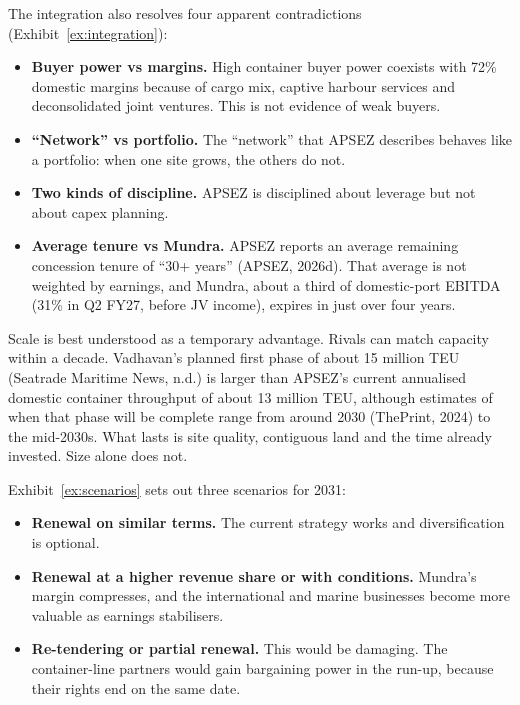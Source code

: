 \documentclass[12pt, a4paper]{article}
\begin{document}
The integration also resolves four apparent contradictions
(Exhibit~\ref{ex:integration}):
\begin{itemize}
  \item \textbf{Buyer power vs margins.} High container buyer power coexists
        with 72\% domestic margins because of cargo mix, captive harbour
        services and deconsolidated joint ventures. This is not evidence of weak
        buyers.
  \item \textbf{``Network'' vs portfolio.} The ``network'' that APSEZ describes
        behaves like a portfolio: when one site grows, the others do not.
  \item \textbf{Two kinds of discipline.} APSEZ is disciplined about leverage
        but not about capex planning.
  \item \textbf{Average tenure vs Mundra.} APSEZ reports an average remaining
        concession tenure of ``30+ years'' (APSEZ, 2026d). That average is not
        weighted by earnings, and Mundra, about a third of domestic-port EBITDA
        (31\% in Q2 FY27, before JV income), expires in just over four years.
\end{itemize}

Scale is best understood as a temporary advantage. Rivals can match capacity
within a decade. Vadhavan's planned first phase of about 15 million TEU
(Seatrade Maritime News, n.d.) is larger than APSEZ's current annualised
domestic container throughput of about 13 million TEU, although estimates of
when that phase will be complete range from around 2030 (ThePrint, 2024) to the
mid-2030s. What lasts is site quality, contiguous land and the time already
invested. Size alone does not.

Exhibit~\ref{ex:scenarios} sets out three scenarios for 2031:
\begin{itemize}
  \item \textbf{Renewal on similar terms.} The current strategy works and
        diversification is optional.
  \item \textbf{Renewal at a higher revenue share or with conditions.} Mundra's
        margin compresses, and the international and marine businesses become
        more valuable as earnings stabilisers.
  \item \textbf{Re-tendering or partial renewal.} This would be damaging. The
        container-line partners would gain bargaining power in the run-up,
        because their rights end on the same date.
\end{itemize}
\end{document}
